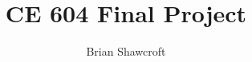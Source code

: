 \documentclass[twoside,leqno,onecolumn]{article}
\begin{document}
%

\title{\Large {CE 604 Final Project}}
    \author{
   Brian Shawcroft
    }    

\date{}

\maketitle

\fancyfoot[C]{\thepage}










%
%
%
%
%
%
%
%
%
%
%

\newpage 

%
%
\newpage



\end{document}
